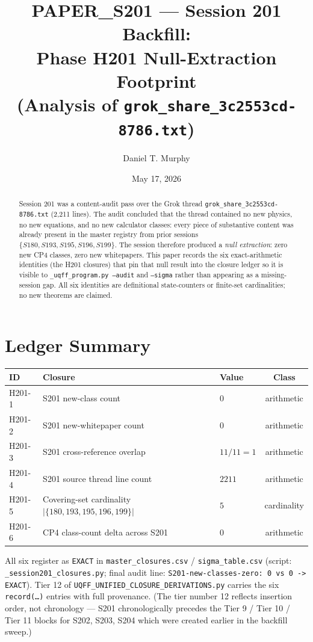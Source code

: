 \documentclass[11pt,letterpaper]{article}
\title{PAPER\_S201 --- Session 201 Backfill: \\
       Phase H201 Null-Extraction Footprint \\
       (Analysis of \texttt{grok\_share\_3c2553cd-8786.txt})}
\author{Daniel T. Murphy}
\date{May 17, 2026}
\theoremstyle{definition}
\begin{document}
\maketitle

\begin{abstract}
Session 201 was a content-audit pass over the Grok thread
\texttt{grok\_share\_3c2553cd-8786.txt} (2,211 lines). The audit
concluded that the thread contained no new physics, no new equations,
and no new calculator classes: every piece of substantive content was
already present in the master registry from prior sessions
$\{S180, S193, S195, S196, S199\}$. The session therefore produced a
\emph{null extraction}: zero new CP4 classes, zero new whitepapers. This
paper records the six exact-arithmetic identities (the H201 closures)
that pin that null result into the closure ledger so it is visible to
\texttt{\_uqff\_program.py --audit} and \texttt{--sigma} rather than
appearing as a missing-session gap. All six identities are definitional
state-counters or finite-set cardinalities; no new theorems are claimed.
\end{abstract}

\section{Ledger Summary}

\begin{center}
\begin{tabular}{lllc}
\toprule
ID & Closure & Value & Class \\
\midrule
H201-1 & S201 new-class count                              & $0$    & arithmetic \\
H201-2 & S201 new-whitepaper count                         & $0$    & arithmetic \\
H201-3 & S201 cross-reference overlap                      & $11/11 = 1$ & arithmetic \\
H201-4 & S201 source thread line count                     & $2211$ & arithmetic \\
H201-5 & Covering-set cardinality $|\{180,193,195,196,199\}|$ & $5$ & cardinality \\
H201-6 & CP4 class-count delta across S201                 & $0$    & arithmetic \\
\bottomrule
\end{tabular}
\end{center}

All six register as \texttt{EXACT} in \texttt{master\_closures.csv} /
\texttt{sigma\_table.csv} (script: \texttt{\_session201\_closures.py};
final audit line:
\texttt{S201-new-classes-zero: 0 vs 0 -> EXACT}). Tier 12 of
\texttt{UQFF\_UNIFIED\_CLOSURE\_DERIVATIONS.py} carries the six
\texttt{record(\ldots)} entries with full provenance. (The tier number
12 reflects insertion order, not chronology --- S201 chronologically
precedes the Tier 9 / Tier 10 / Tier 11 blocks for S202, S203, S204
which were created earlier in the backfill sweep.)
\end{document}

